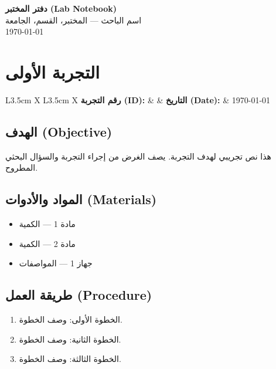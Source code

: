 \documentclass[11pt,a4paper]{article}
\newcommand{\entryinfo}[2]{%
\begin{table}[H]
\centering
\begin{tabularx}{\textwidth}{L{3.5cm} X L{3.5cm} X}
\toprule
\textbf{رقم التجربة (ID):} & #1 & \textbf{التاريخ (Date):} & #2 \\
\bottomrule
\end{tabularx}
\end{table}
}
\begin{document}
\thispagestyle{fancy}

\begin{center}
{\LARGE\bfseries دفتر المختبر (Lab Notebook)}\\[0.8em]
{\large اسم الباحث --- المختبر، القسم، الجامعة}\\[0.3em]
{\small \today}
\end{center}

\vspace{1em}

\section{التجربة الأولى}

\entryinfo{}{\today}

\subsection*{الهدف (Objective)}
هذا نص تجريبي لهدف التجربة. يصف الغرض من إجراء التجربة والسؤال البحثي المطروح.

\subsection*{المواد والأدوات (Materials)}
\begin{itemize}
    \item مادة 1 --- الكمية
    \item مادة 2 --- الكمية
    \item جهاز 1 --- المواصفات
\end{itemize}

\subsection*{طريقة العمل (Procedure)}
\begin{enumerate}
    \item الخطوة الأولى: وصف الخطوة.
    \item الخطوة الثانية: وصف الخطوة.
    \item الخطوة الثالثة: وصف الخطوة.
\end{enumerate}
\end{document}
